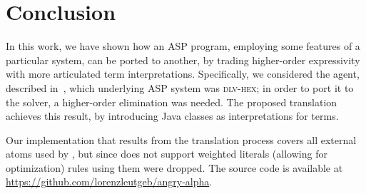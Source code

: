 \section{Conclusion}
\label{sec:conc}

In this work, we have shown how an ASP program, employing some features of a particular system, can be ported to another, by trading higher-order expressivity with more articulated term interpretations.
Specifically, we considered the \ah agent, described in~\cite{angryhex}, which underlying ASP system was \textsc{dlv-hex}; in order to port it to the \al solver, a higher-order elimination was needed.
The proposed translation achieves this result, by introducing Java classes as interpretations for terms.

Our implementation that results from the translation process covers all external atoms used by \ah, but since \al does not support weighted literals (allowing for optimization) rules using them were dropped. The source code is available at \url{https://github.com/lorenzleutgeb/angry-alpha}.


